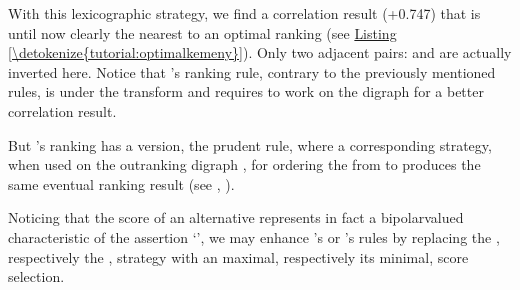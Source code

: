 \documentclass[a4paper,12pt,english]{sphinxhowto}
\begin{document}
With this  lexicographic  strategy, we find a correlation result (+0.747) that is until now clearly the nearest to an optimal  ranking (see \hyperref[\detokenize{tutorial:optimalkemeny}]{Listing \ref{\detokenize{tutorial:optimalkemeny}}}). Only two adjacent pairs: \sphinxstyleemphasis{{[}a6, a7{]}} and \sphinxstyleemphasis{{[}a8, a9{]}} are actually inverted here. Notice that ’s ranking rule, contrary to the previously mentioned rules, is   under the  transform and requires to work on the  digraph  for a better correlation result.

\begin{sphinxVerbatim}[commandchars=\\\{\},numbers=left,firstnumber=1,stepnumber=1]
\end{sphinxVerbatim}

But ’s ranking has a  version, the prudent   rule, where a corresponding  strategy, when used on the  outranking digraph , for ordering the from  to  produces the same eventual ranking result (see , ).

Noticing that the  score of an alternative  represents in fact a bipolar\sphinxhyphen{}valued characteristic of the assertion ‘’, we may enhance ’s or ’s rules by replacing the , respectively the , strategy with an  maximal, respectively its  minimal,  score selection.
\end{document}
